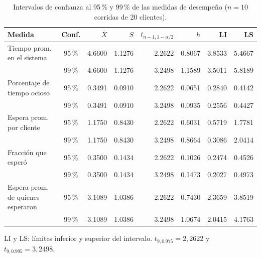 \begin{table}[H]
\centering
\caption{Intervalos de confianza al 95\,\% y 99\,\% de las medidas de desempe\~no ($n=10$ corridas de 20 clientes).}
\label{tab:ci20}
\footnotesize
\begin{tabular}{@{}lcrrrrrr@{}}
\toprule
Medida & Conf. & $\bar{X}$ & $S$ & $t_{n-1,1-\alpha/2}$ & $h$ & LI & LS \\
\midrule
Tiempo prom. en el sistema & 95\,\% & 4.6600 & 1.1276 & 2.2622 & 0.8067 & 3.8533 & 5.4667 \\
 & 99\,\% & 4.6600 & 1.1276 & 3.2498 & 1.1589 & 3.5011 & 5.8189 \\
\addlinespace
Porcentaje de tiempo ocioso & 95\,\% & 0.3491 & 0.0910 & 2.2622 & 0.0651 & 0.2840 & 0.4142 \\
 & 99\,\% & 0.3491 & 0.0910 & 3.2498 & 0.0935 & 0.2556 & 0.4427 \\
\addlinespace
Espera prom. por cliente & 95\,\% & 1.1750 & 0.8430 & 2.2622 & 0.6031 & 0.5719 & 1.7781 \\
 & 99\,\% & 1.1750 & 0.8430 & 3.2498 & 0.8664 & 0.3086 & 2.0414 \\
\addlinespace
Fracci\'on que esper\'o & 95\,\% & 0.3500 & 0.1434 & 2.2622 & 0.1026 & 0.2474 & 0.4526 \\
 & 99\,\% & 0.3500 & 0.1434 & 3.2498 & 0.1473 & 0.2027 & 0.4973 \\
\addlinespace
Espera prom. de quienes esperaron & 95\,\% & 3.1089 & 1.0386 & 2.2622 & 0.7430 & 2.3659 & 3.8519 \\
 & 99\,\% & 3.1089 & 1.0386 & 3.2498 & 1.0674 & 2.0415 & 4.1763 \\
\bottomrule
\end{tabular}
\begin{minipage}{\textwidth}\vspace{2pt}\footnotesize
LI y LS: l\'imites inferior y superior del intervalo. $t_{9,0.975}=2{,}2622$ y $t_{9,0.995}=3{,}2498$.
\end{minipage}
\end{table}